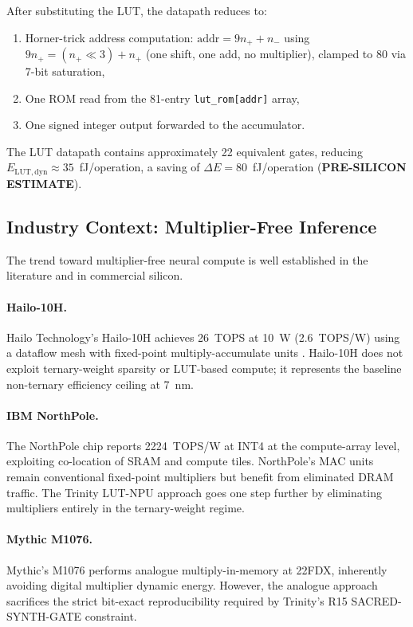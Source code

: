 After substituting the LUT, the datapath reduces to:
\begin{enumerate}
  \item Horner-trick address computation: $\mathrm{addr} = 9 n_{+} + n_{-}$
    using $9 n_{+} = (n_{+} \ll 3) + n_{+}$ (one shift, one add, no multiplier),
    clamped to 80 via 7-bit saturation,
  \item One ROM read from the 81-entry \texttt{lut\_rom[addr]} array,
  \item One signed integer output forwarded to the accumulator.
\end{enumerate}

The LUT datapath contains approximately 22 equivalent gates, reducing
$E_{\mathrm{LUT,dyn}} \approx 35$~fJ/operation, a saving of
$\Delta E = 80$~fJ/operation (\textbf{PRE-SILICON ESTIMATE}).

\subsection{Industry Context: Multiplier-Free Inference}

The trend toward multiplier-free neural compute is well established in
the literature and in commercial silicon.

\paragraph{Hailo-10H.}  Hailo Technology's Hailo-10H achieves
26~TOPS at 10~W (2.6~TOPS/W) using a dataflow mesh with fixed-point
multiply-accumulate units \cite{hailo10h_2024}.  Hailo-10H does not
exploit ternary-weight sparsity or LUT-based compute; it represents the
baseline non-ternary efficiency ceiling at 7~nm.

\paragraph{IBM NorthPole.}  The NorthPole chip \cite{ibm_northpole_2023}
reports 2224~TOPS/W at INT4 at the compute-array level, exploiting
co-location of SRAM and compute tiles.  NorthPole's MAC units remain
conventional fixed-point multipliers but benefit from eliminated DRAM
traffic.  The Trinity LUT-NPU approach goes one step further by
eliminating multipliers entirely in the ternary-weight regime.

\paragraph{Mythic M1076.}  Mythic's M1076 \cite{mythic_m1076_2021}
performs analogue multiply-in-memory at 22FDX, inherently avoiding
digital multiplier dynamic energy.  However, the analogue approach
sacrifices the strict bit-exact reproducibility required by Trinity's
R15 SACRED-SYNTH-GATE constraint.

